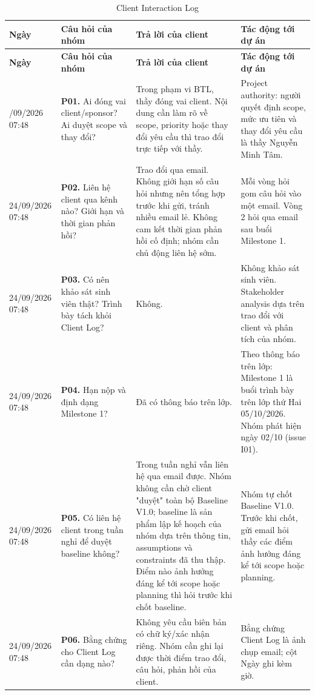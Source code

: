 \begin{landscape}
\begingroup\tblsetup\footnotesize\renewcommand{\arraystretch}{1.1}\tblzebra
\begin{longtable}{L{2.08cm}L{7.22cm}L{6.32cm}L{4.70cm}}
\caption{Client Interaction Log}\label{tab:client-log}\\
\toprule
{}\textbf{Ngày} & \textbf{Câu hỏi của nhóm} & \textbf{Trả lời của client} & \textbf{Tác động tới dự án} \\
\midrule
\endfirsthead
\toprule
{}\textbf{Ngày} & \textbf{Câu hỏi của nhóm} & \textbf{Trả lời của client} & \textbf{Tác động tới dự án} \\
\midrule
\endhead
\bottomrule
{}/09/2026 07:48 & \textbf{P01.} Ai đóng vai client/sponsor? Ai duyệt scope và thay đổi? & Trong phạm vi BTL, thầy đóng vai client. Nội dung cần làm rõ về scope, priority hoặc thay đổi yêu cầu thì trao đổi trực tiếp với thầy. & Project authority: người quyết định scope, mức ưu tiên và thay đổi yêu cầu là thầy Nguyễn Minh Tâm. \\
24/09/2026 07:48 & \textbf{P02.} Liên hệ client qua kênh nào? Giới hạn và thời gian phản hồi? & Trao đổi qua email. Không giới hạn số câu hỏi nhưng nên tổng hợp trước khi gửi, tránh nhiều email lẻ. Không cam kết thời gian phản hồi cố định; nhóm cần chủ động liên hệ sớm. & Mỗi vòng hỏi gom câu hỏi vào một email. Vòng 2 hỏi qua email sau buổi Milestone 1. \\
24/09/2026 07:48 & \textbf{P03.} Có nên khảo sát sinh viên thật? Trình bày tách khỏi Client Log? & Không. & Không khảo sát sinh viên. Stakeholder analysis dựa trên trao đổi với client và phân tích của nhóm. \\
24/09/2026 07:48 & \textbf{P04.} Hạn nộp và định dạng Milestone 1? & Đã có thông báo trên lớp. & Theo thông báo trên lớp: Milestone 1 là buổi trình bày trên lớp thứ Hai 05/10/2026. Nhóm phát hiện ngày 02/10 (issue I01). \\
24/09/2026 07:48 & \textbf{P05.} Có liên hệ client trong tuần nghỉ để duyệt baseline không? & Trong tuần nghỉ vẫn liên hệ qua email được. Nhóm không cần chờ client "duyệt" toàn bộ Baseline V1.0; baseline là sản phẩm lập kế hoạch của nhóm dựa trên thông tin, assumptions và constraints đã thu thập. Điểm nào ảnh hưởng đáng kể tới scope hoặc planning thì hỏi trước khi chốt baseline. & Nhóm tự chốt Baseline V1.0. Trước khi chốt, gửi email hỏi thầy các điểm ảnh hưởng đáng kể tới scope hoặc planning. \\
24/09/2026 07:48 & \textbf{P06.} Bằng chứng cho Client Log cần dạng nào? & Không yêu cầu biên bản có chữ ký/xác nhận riêng. Nhóm cần ghi lại được thời điểm trao đổi, câu hỏi, phản hồi của client. & Bằng chứng Client Log là ảnh chụp email; cột Ngày ghi kèm giờ. \\

\end{longtable}
\end{landscape}
